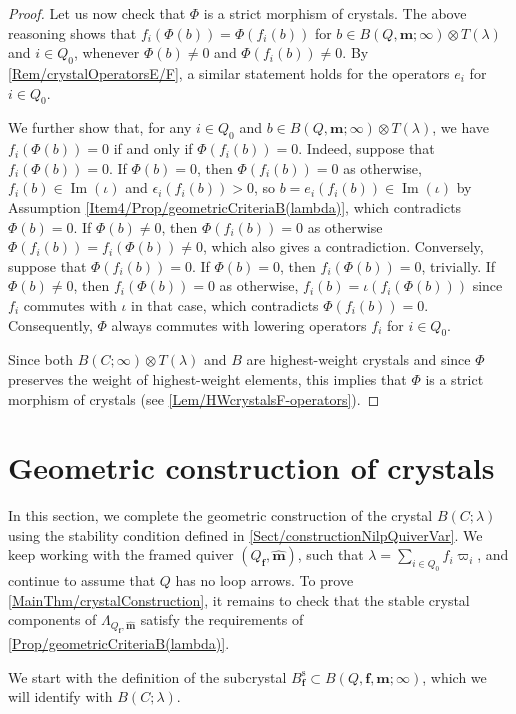 \documentclass[a4paper,12pt]{article}
\theoremstyle{definition}
\theoremstyle{plain}
\theoremstyle{remark}
\DeclareMathOperator{\Ima}{Im}
\newcommand{\st}{\mathrm{s}}
\newcommand\bff{\mathbf{f}}
\newcommand\bfm{\mathbf{m}}
\begin{document}
\begin{proof}
Let us now check that $\Phi$ is a strict morphism of crystals. The above reasoning shows that $f_i(\Phi(b))=\Phi(f_i(b))$ for $b\in B(Q,\bfm;\infty)\otimes T(\lambda)$ and $i\in Q_0$, whenever $\Phi(b)\ne0$ and $\Phi(f_i(b))\ne0$. By \cref{Rem/crystalOperatorsE/F}, a similar statement holds for the operators $e_i$ for $ i\in Q_0$.

We further show that, for any $i\in Q_0$ and $b\in B(Q,\bfm;\infty)\otimes T(\lambda)$, we have $f_i(\Phi(b))=0$ if and only if $\Phi(f_i(b))=0$. Indeed, suppose that $f_i(\Phi(b))=0$. If $\Phi(b)=0$, then $\Phi(f_i(b))=0$ as otherwise, $f_i(b)\in\Ima(\iota)$ and $\epsilon_i(f_i(b))>0$, so $b=e_i(f_i(b))\in\Ima(\iota)$ by Assumption  \ref{Item4/Prop/geometricCriteriaB(lambda)}, which contradicts $\Phi(b)=0$. If $\Phi(b)\ne 0$, then $\Phi(f_i(b))=0$ as otherwise $\Phi(f_i(b))=f_i(\Phi(b))\ne 0$, which also gives a contradiction. Conversely, suppose that $\Phi(f_i(b))=0$. If $\Phi(b)=0$, then $f_i(\Phi(b))=0$, trivially. If $\Phi(b)\ne 0$, then $f_i(\Phi(b))=0$ as otherwise, $f_i(b)=\iota(f_i(\Phi(b)))$ since $f_i$ commutes with $\iota$ in that case, which contradicts $\Phi(f_i(b))=0$. Consequently, $\Phi$ always commutes with lowering operators $f_i$ for $ i\in Q_0$.

Since both $B(C;\infty)\otimes T(\lambda)$ and $B$ are highest-weight crystals and since $\Phi$ preserves the weight of highest-weight elements, this implies that $\Phi$ is a strict morphism of crystals (see \cref{Lem/HWcrystalsF-operators}).
\end{proof}


\section{Geometric construction of crystals}\label{Sect/GeometricHWCrystals}

In this section, we complete the geometric construction of the crystal $B(C;\lambda)$ using the stability condition defined in \cref{Sect/constructionNilpQuiverVar}. We keep working with the framed quiver $(Q_\bff,\widehat{\bfm})$, such that $\lambda=\sum_{i\in Q_0}f_i\varpi_i$, and continue to assume that $Q$ has no loop arrows. To prove \cref{MainThm/crystalConstruction}, it remains to check that the stable crystal components of $\Lambda_{Q_\bff,\widehat{\bfm}}$ satisfy the requirements of \cref{Prop/geometricCriteriaB(lambda)}.

We start with the definition of the subcrystal $B_\bff^\st\subset B(Q,\bff,\bfm;\infty)$, which we will identify with $B(C;\lambda)$.
\end{document}
